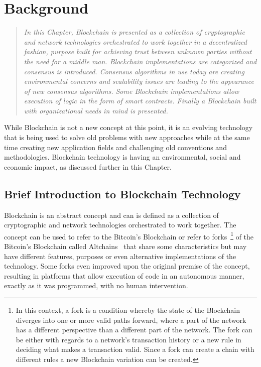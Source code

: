 \chapter{Background}\label{background}

\begin{quote} 
  \emph{In this Chapter, Blockchain is presented as a collection of
  cryptographic and network technologies orchestrated to work together in a
  decentralized fashion, purpose built for achieving trust between unknown
  parties without the need for a middle man. Blockchain implementations are
  categorized and consensus is introduced. Consensus algorithms in use today
  are creating environmental concerns and scalability issues are leading to the
  appearance of new consensus algorithms.  Some Blockchain implementations
  allow execution of logic in the form of smart contracts. Finally a Blockchain
  built with organizational needs in mind is presented.}
\end{quote}


While Blockchain is not a new concept at this point, it is an evolving
technology that is being used to solve old problems with new approaches while
at the same time creating new application fields and challenging old
conventions and methodologies.  Blockchain technology is having an
environmental, social and economic impact, as discussed further in this
Chapter.

\section{Brief Introduction to Blockchain Technology}

Blockchain is an abstract concept and can is defined as a collection of
cryptographic and network technologies orchestrated to work together. The
concept can be used to refer to the Bitcoin's Blockchain or refer to
forks~\footnote{In this context, a fork is a condition whereby the state of the
Blockchain diverges into one or more valid paths forward, where a part of the
network has a different perspective than a different part of the network. The
fork can be either with regards to a network's transaction history or a new
rule in deciding what makes a transaction valid. Since a fork can create a
chain with different rules a new Blockchain variation can be created.} of the
Bitcoin's Blockchain called Altchains~\cite{Lewis2015} that share some
characteristics but may have different features, purposes or even alternative
implementations of the technology. Some forks even improved upon the original
premise of the concept, resulting in platforms that allow execution of code in
an autonomous manner, exactly as it was programmed, with no human intervention.

